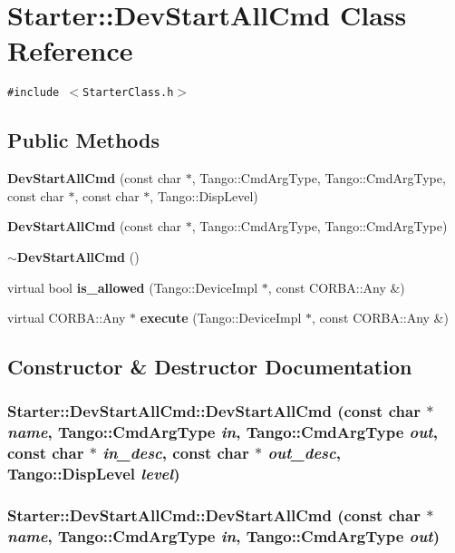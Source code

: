 \section{Starter::Dev\-Start\-All\-Cmd  Class Reference}
\label{classStarter_1_1DevStartAllCmd}
{\tt \#include $<$Starter\-Class.h$>$}

\subsection*{Public Methods}
\begin{CompactItemize}
\item 
{\bf Dev\-Start\-All\-Cmd} (const char $\ast$, Tango::Cmd\-Arg\-Type, Tango::Cmd\-Arg\-Type, const char $\ast$, const char $\ast$, Tango::Disp\-Level)
\item 
{\bf Dev\-Start\-All\-Cmd} (const char $\ast$, Tango::Cmd\-Arg\-Type, Tango::Cmd\-Arg\-Type)
\item 
{\bf $\sim$Dev\-Start\-All\-Cmd} ()
\item 
virtual bool {\bf is\_\-allowed} (Tango::Device\-Impl $\ast$, const CORBA::Any \&)
\item 
virtual CORBA::Any $\ast$ {\bf execute} (Tango::Device\-Impl $\ast$, const CORBA::Any \&)
\end{CompactItemize}


\subsection{Constructor \& Destructor Documentation}
\subsubsection{\setlength{\rightskip}{0pt plus 5cm}Starter::Dev\-Start\-All\-Cmd::Dev\-Start\-All\-Cmd (const char $\ast$ {\em name}, Tango::Cmd\-Arg\-Type {\em in}, Tango::Cmd\-Arg\-Type {\em out}, const char $\ast$ {\em in\_\-desc}, const char $\ast$ {\em out\_\-desc}, Tango::Disp\-Level {\em level})}\label{classStarter_1_1DevStartAllCmd_a0}


\subsubsection{\setlength{\rightskip}{0pt plus 5cm}Starter::Dev\-Start\-All\-Cmd::Dev\-Start\-All\-Cmd (const char $\ast$ {\em name}, Tango::Cmd\-Arg\-Type {\em in}, Tango::Cmd\-Arg\-Type {\em out})}\label{classStarter_1_1DevStartAllCmd_a1}


